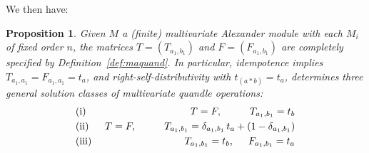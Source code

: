 \documentclass[a4paper,12pt]{article}
\newtheorem{proposition}{Proposition}[section]
\begin{document}
We then have:  
\begin{proposition}
Given $M$ a (finite) multivariate Alexander module with each $M_i$ of fixed order $n$, the matrices $T = (T_{ a_1, b_1 })$ and $F = (F_{ a_1, b_1 })$ are completely specified by Definition~\ref{def:maquand}.  In particular, idempotence implies $T_{ a_1, a_1 } = F_{ a_1, a_1 } = t_a$,  and  right-self-distributivity with $t_{(a * b)} = t_{a}$, determines three general solution classes of multivariate quandle operations:  
\begin{eqnarray*}
  &\text{(i) }& T = F, \qquad  \;\,\   T_{ a_1, b_1 } = t_b   \\  
  &\text{(ii) }& T = F, \qquad  \;\,\  T_{ a_1, b_1 } = \delta_{ a_1, b_1 } \, t_a + (1 - \delta_{ a_1, b_1 })   \\  
  &\text{(iii) }& T_{ a_1, b_1 } = t_b, \hspace{,5cm}  F_{ a_1, b_1 } = t_a
\end{eqnarray*}
\end{proposition}
\end{document}
